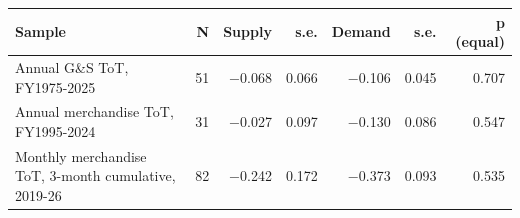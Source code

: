 \begin{tabular}{lrrrrrr}
\toprule
Sample & N & Supply & s.e. & Demand & s.e. & p (equal) \\
\midrule
Annual G\&S ToT, FY1975-2025 & 51 & $-$0.068 & 0.066 & $-$0.106 & 0.045 & 0.707 \\
Annual merchandise ToT, FY1995-2024 & 31 & $-$0.027 & 0.097 & $-$0.130 & 0.086 & 0.547 \\
Monthly merchandise ToT, 3-month cumulative, 2019-26 & 82 & $-$0.242 & 0.172 & $-$0.373 & 0.093 & 0.535 \\
\bottomrule
\end{tabular}
